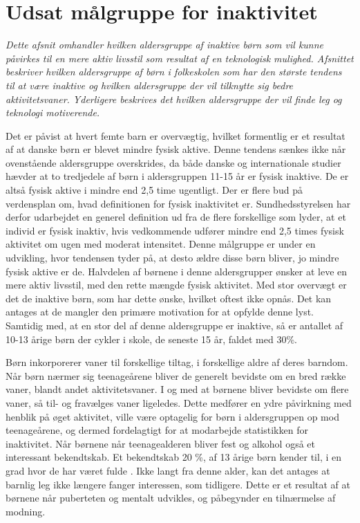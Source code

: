 \section {Udsat målgruppe for inaktivitet}
\textit{Dette afsnit omhandler hvilken aldersgruppe af inaktive børn som vil kunne påvirkes til en mere aktiv livsstil som resultat af en teknologisk mulighed. Afsnittet beskriver hvilken aldersgruppe af børn i folkeskolen som har den største tendens til at være inaktive og hvilken aldersgruppe der vil tilknytte sig bedre aktivitetsvaner. Yderligere beskrives det hvilken aldersgruppe der vil finde leg og teknologi motiverende.}
				
Det er påvist at hvert femte barn er overvægtig, hvilket formentlig er et resultat af at danske børn er blevet mindre fysisk aktive\citep{Universitet2014}. Denne tendens sænkes ikke når ovenstående aldersgruppe overskrides, da både danske og internationale studier hævder at to tredjedele af børn i aldersgruppen 11-15 år er fysisk inaktive. De er altså fysisk aktive i mindre end 2,5 time ugentligt. 
Der er flere bud på verdensplan om, hvad definitionen for fysisk inaktivitet er. Sundhedsstyrelsen har derfor udarbejdet en generel definition ud fra de flere forskellige som lyder, at et individ er fysisk inaktiv, hvis vedkommende udfører mindre end 2,5 times fysisk aktivitet om ugen med moderat intensitet.\citep{Kiens2007}
Denne målgruppe er under en udvikling, hvor tendensen tyder på, at desto ældre disse børn bliver, jo mindre fysisk aktive er de. Halvdelen af børnene i denne aldersgrupper ønsker at leve en mere aktiv livsstil, med den rette mængde fysisk aktivitet. Med stor overvægt er det de inaktive børn, som har dette ønske, hvilket oftest ikke opnås. Det kan antages at de mangler den primære motivation for at opfylde denne lyst. Samtidig med, at en stor del af denne aldersgruppe er inaktive, så er antallet af 10-13 årige børn der cykler i skole, de seneste 15 år, faldet med 30\%. \citep{Sundhedsstyrelsen2006}

Børn inkorporerer vaner til forskellige tiltag, i forskellige aldre af deres barndom. Når børn nærmer sig teenageårene bliver de generelt bevidste om en bred række vaner, blandt andet aktivitetsvaner. I og med at børnene bliver bevidste om flere vaner, så til- og fravælges vaner ligeledes. Dette medfører en ydre påvirkning med henblik på øget aktivitet, ville være optagelig for børn i aldersgruppen op mod teenageårene, og dermed fordelagtigt for at modarbejde statistikken for inaktivitet. \citep{Laub2011} Når børnene når teenagealderen bliver fest og alkohol også et interessant bekendtskab. Et bekendtskab 20 \%, af 13 årige børn kender til, i en grad hvor de har været fulde \citep{Sundhedsstyrelsen2016a}. Ikke langt fra denne alder, kan det antages at barnlig leg ikke længere fanger interessen, som tidligere. Dette er et resultat af at børnene når puberteten og mentalt udvikles, og påbegynder en tilnærmelse af modning. \citep{Skovby2014}

